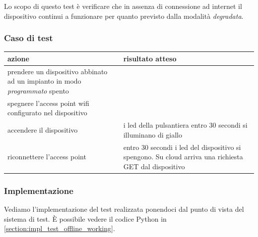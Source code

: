 \documentclass[12pt,a4paper,twoside,titlepage]{book}
\begin{document}
Lo scopo di questo test è verificare che in assenza di connessione ad internet il
dispositivo continui a funzionare per quanto previsto dalla modalità \textit{degradata}.

\subsubsection{Caso di test}
\begin{center}
\begin{tabular}{| p{} | p{} |}
    \hline
    \textbf{azione} & \textbf{risultato atteso} \\ \hline 
    prendere un dispositivo abbinato ad un impianto in modo \textit{programmato} spento & \\ \hline 
    spegnere l'access point \Gls{wifi} configurato nel dispositivo & \\ \hline 
    accendere il dispositivo & i \acrshort{led} della pulsantiera entro 30 secondi si illuminano di giallo \\ \hline 
    riconnettere l'access point & entro 30 secondi i \acrshort{led} del dispositivo si spengono. Su cloud arriva una richiesta GET dal dispositivo \\ \hline
\end{tabular}
\end{center}

\subsubsection{Implementazione}
Vediamo l'implementazione del test realizzata ponendoci dal punto di vista del sistema di test. 
È possibile vedere il codice Python in \autoref{section:impl_test_offline_working}.
\end{document}
